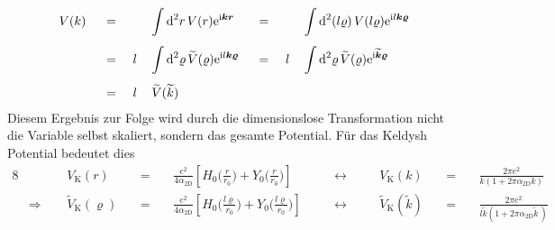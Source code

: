\documentclass[a4paper,11pt, twoside]{article}
\newcommand{\+}{\dagger}
\renewcommand{\exp}[1]{\tt{e}^{#1}}
\renewcommand{\^}{\hat}
\renewcommand{\tt}{\text}
\renewcommand{\~}{\widetilde}
\begin{document}
\begin{alignat*}{8}
& V(k) && \ = \ && && \int \tt d^2 r \,  V(r)  \exp{\tt i\bm k \bm r} 
 && \ = \ && &&\int \tt d^2 (l\varrho) \,  V(l\varrho)  \exp{\tt i l \bm k \bm \varrho} \\[4pt]
& && \ = \ && l &&\int \tt d^2 \varrho \,  \~V(\varrho)  \exp{\tt i l \bm k \bm \varrho} 
 && \ = \ && l &&\int \tt d^2 \varrho \,  \~V(\varrho)  \exp{\tt i \~{\bm k} \bm \varrho} \\[4pt]
& && \ = \ && l &&\,\~V(\~ k) 
\end{alignat*}
Diesem Ergebnis zur Folge wird durch die dimensionslose Transformation nicht die Variable selbst skaliert, sondern das gesamte Potential. Für das Keldysh Potential bedeutet dies 
\begin{alignat*}{8}
& && V_\tt{K}(r) &&\ = \ && \frac{e^2}{4\alpha_\tt{2D}}\left [H_0\Big(\frac{r}{r_0}\Big)+Y_0\Big(\frac{r}{r_0}\Big)\right ] 
&&\quad \leftrightarrow\quad &&
V_\tt{K}(k) &&\ = \ && \frac{2\pi e^2}{k(1+2\pi\alpha_\tt{2D}k)} \\[5pt]
& \Rightarrow\ \ && \~V_\tt{K}(\varrho) &&\ = \ && \frac{e^2}{4\alpha_\tt{2D}}\left [H_0\Big(\frac{l\varrho}{r_0}\Big)+Y_0\Big(\frac{l\varrho}{r_0}\Big)\right ] 
&&\quad \leftrightarrow\quad &&
\~V_\tt{K}(\~k) &&\ = \ && \frac{2\pi e^2}{l\~ k(1+2\pi\alpha_\tt{2D}\~ k\,)} 
\end{alignat*}
\newpage
\end{document}
